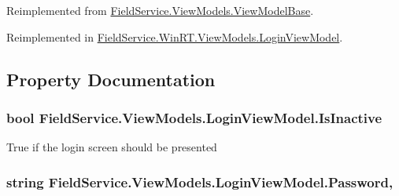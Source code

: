 Reimplemented from \hyperlink{class_field_service_1_1_view_models_1_1_view_model_base_a872d3f368bf241242ff6cff4589c54d8}{Field\+Service.\+View\+Models.\+View\+Model\+Base}.



Reimplemented in \hyperlink{class_field_service_1_1_win_r_t_1_1_view_models_1_1_login_view_model_ac068dc643a7e4c7b80b1668a69da6733}{Field\+Service.\+Win\+R\+T.\+View\+Models.\+Login\+View\+Model}.



\subsection{Property Documentation}
\hypertarget{class_field_service_1_1_view_models_1_1_login_view_model_a896ce645e14190629e0feefb1a33b7e2}{
\subsubsection[{Is\+Inactive}]{\setlength{\rightskip}{0pt plus 5cm}bool Field\+Service.\+View\+Models.\+Login\+View\+Model.\+Is\+Inactive\hspace{0.3cm}{\ttfamily [get]}}}\label{class_field_service_1_1_view_models_1_1_login_view_model_a896ce645e14190629e0feefb1a33b7e2}


True if the login screen should be presented 

\hypertarget{class_field_service_1_1_view_models_1_1_login_view_model_a1da03b3071aef0fcaea92f6c8f9518fe}{
\subsubsection[{Password}]{\setlength{\rightskip}{0pt plus 5cm}string Field\+Service.\+View\+Models.\+Login\+View\+Model.\+Password\hspace{0.3cm}{\ttfamily [get]}, {\ttfamily [set]}}}\label{class_field_service_1_1_view_models_1_1_login_view_model_a1da03b3071aef0fcaea92f6c8f9518fe}


